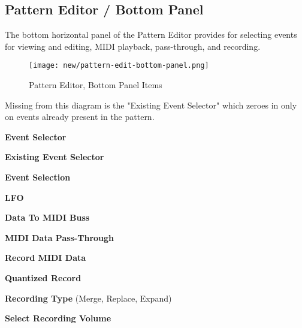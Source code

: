 \subsection{Pattern Editor / Bottom Panel}
\label{subsec:pattern_editor_bottom}

   The bottom horizontal panel of the Pattern Editor provides for
   selecting events for viewing and editing, MIDI playback,
   pass-through, and recording.

\begin{figure}[H]
   \centering 
   \texttt{[image: new/pattern-edit-bottom-panel.png]}
   \caption{Pattern Editor, Bottom Panel Items}
   \label{fig:pattern_editor_bottom_panel_items}
\end{figure}

   Missing from this diagram is the "Existing Event Selector" which zeroes
   in only on events already present in the pattern.

%

   \begin{enumber}
      \item \textbf{Event Selector}
      \item \textbf{Existing Event Selector}
      \item \textbf{Event Selection}
      \item \textbf{LFO}
      \item \textbf{Data To MIDI Buss}
      \item \textbf{MIDI Data Pass-Through}
      \item \textbf{Record MIDI Data}
      \item \textbf{Quantized Record}
      \item \textbf{Recording Type} (Merge, Replace, Expand)
      \item \textbf{Select Recording Volume}
   \end{enumber}

